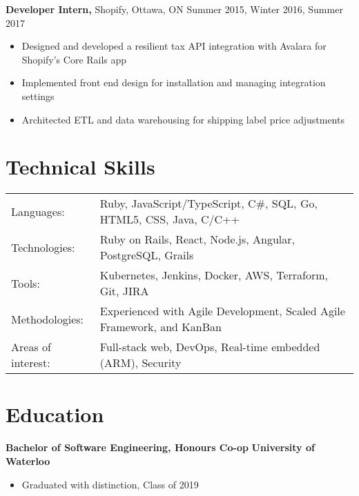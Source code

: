 \documentclass[line, centered]{res}
\begin{document}
\begin{resume}
	{\bf Developer Intern,} Shopify, Ottawa, ON \hfill Summer 2015, Winter 2016, Summer 2017\\[-8pt]
	\begin{itemize} \itemsep -1pt
		\item Designed and developed a resilient tax API integration with Avalara for Shopify's Core Rails app
		\item Implemented front end design for installation and managing integration settings
		\item Architected ETL and data warehousing for shipping label price adjustments
	\end{itemize}
	\section{Technical Skills}
	\begin{tabular}{l l}
		Languages:          & Ruby, JavaScript/TypeScript, C\#, SQL, Go, HTML5, CSS, Java, C/C++
		\\
		Technologies:       & Ruby on Rails, React, Node.js, Angular, PostgreSQL, Grails
		\\
		Tools:              & Kubernetes, Jenkins, Docker, AWS, Terraform, Git, JIRA
		\\
		Methodologies:      & Experienced with Agile Development, Scaled Agile Framework, and KanBan
		\\
		Areas of interest: & Full-stack web, DevOps, Real-time embedded (ARM), Security
	\end{tabular}


	\section{Education}
	\vspace{2pt}
	\textbf{Bachelor of Software Engineering, Honours Co-op} \hfill {\bf University of Waterloo}
	\begin{itemize} \itemsep -1pt
		\item Graduated with distinction, Class of 2019
	\end{itemize}

\end{resume}
\end{document}

